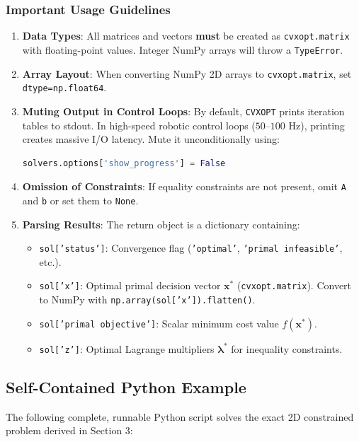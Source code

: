 \documentclass[11pt,a4paper]{article}
\begin{document}
\subsubsection{Important Usage Guidelines}
\begin{enumerate}
    \item \textbf{Data Types}: All matrices and vectors \textbf{must} be created as \texttt{cvxopt.matrix} with floating-point values. Integer NumPy arrays will throw a \texttt{TypeError}.
    \item \textbf{Array Layout}: When converting NumPy 2D arrays to \texttt{cvxopt.matrix}, set \texttt{dtype=np.float64}.
    \item \textbf{Muting Output in Control Loops}: By default, \texttt{CVXOPT} prints iteration tables to stdout. In high-speed robotic control loops ($50\text{--}100\text{ Hz}$), printing creates massive I/O latency. Mute it unconditionally using:
    \begin{lstlisting}[language=Python]
solvers.options['show_progress'] = False
    \end{lstlisting}
    \item \textbf{Omission of Constraints}: If equality constraints are not present, omit \texttt{A} and \texttt{b} or set them to \texttt{None}.
    \item \textbf{Parsing Results}: The return object is a dictionary containing:
    \begin{itemize}
        \item \texttt{sol['status']}: Convergence flag (\texttt{'optimal'}, \texttt{'primal infeasible'}, etc.).
        \item \texttt{sol['x']}: Optimal primal decision vector $\mathbf{x}^*$ (\texttt{cvxopt.matrix}). Convert to NumPy with \texttt{np.array(sol['x']).flatten()}.
        \item \texttt{sol['primal objective']}: Scalar minimum cost value $f(\mathbf{x}^*)$.
        \item \texttt{sol['z']}: Optimal Lagrange multipliers $\bm{\lambda}^*$ for inequality constraints.
    \end{itemize}
\end{enumerate}

\subsection{Self-Contained Python Example}
The following complete, runnable Python script solves the exact 2D constrained problem derived in Section 3:
\end{document}
